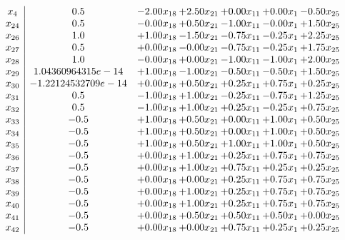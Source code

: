 \documentclass[8pt]{article}
\begin{document}
\[\begin{array}{c| c c@{\hskip 2pt} c@{\hskip 2pt} c@{\hskip 2pt} c@{\hskip 2pt} c@{\hskip 2pt} }
 x_{4}   &  0.5 & -2.00 x_{18} & +  2.50 x_{21} & +  0.00 x_{11} & +  0.00 x_{1} & -0.50 x_{25}\\
 x_{24}   &  0.5 & -0.00 x_{18} & +  0.50 x_{21} & -1.00 x_{11} & -0.00 x_{1} & +  1.50 x_{25}\\
 x_{26}   &  1.0 & +  1.00 x_{18} & -1.50 x_{21} & -0.75 x_{11} & -0.25 x_{1} & +  2.25 x_{25}\\
 x_{27}   &  0.5 & +  0.00 x_{18} & -0.00 x_{21} & -0.75 x_{11} & -0.25 x_{1} & +  1.75 x_{25}\\
 x_{28}   &  1.0 & -0.00 x_{18} & +  0.00 x_{21} & -1.00 x_{11} & -1.00 x_{1} & +  2.00 x_{25}\\
 x_{29}   &  1.04360964315e-14 & +  1.00 x_{18} & -1.00 x_{21} & -0.50 x_{11} & -0.50 x_{1} & +  1.50 x_{25}\\
 x_{30}   &  -1.22124532709e-14 & +  0.00 x_{18} & +  0.50 x_{21} & +  0.25 x_{11} & +  0.75 x_{1} & +  0.25 x_{25}\\
 x_{31}   &  0.5 & -1.00 x_{18} & +  1.00 x_{21} & -0.25 x_{11} & -0.75 x_{1} & +  1.25 x_{25}\\
 x_{32}   &  0.5 & -1.00 x_{18} & +  1.00 x_{21} & +  0.25 x_{11} & -0.25 x_{1} & +  0.75 x_{25}\\
 x_{33}   &  -0.5 & +  1.00 x_{18} & +  0.50 x_{21} & +  0.00 x_{11} & +  1.00 x_{1} & +  0.50 x_{25}\\
 x_{34}   &  -0.5 & +  1.00 x_{18} & +  0.50 x_{21} & +  0.00 x_{11} & +  1.00 x_{1} & +  0.50 x_{25}\\
 x_{35}   &  -0.5 & +  1.00 x_{18} & +  0.50 x_{21} & +  1.00 x_{11} & +  1.00 x_{1} & +  0.50 x_{25}\\
 x_{36}   &  -0.5 & +  0.00 x_{18} & +  1.00 x_{21} & +  0.25 x_{11} & +  0.75 x_{1} & +  0.75 x_{25}\\
 x_{37}   &  -0.5 & +  0.00 x_{18} & +  1.00 x_{21} & +  0.75 x_{11} & +  0.25 x_{1} & +  0.25 x_{25}\\
 x_{38}   &  -0.5 & +  0.00 x_{18} & +  0.00 x_{21} & +  0.25 x_{11} & +  0.75 x_{1} & +  0.75 x_{25}\\
 x_{39}   &  -0.5 & +  0.00 x_{18} & +  1.00 x_{21} & +  0.25 x_{11} & +  0.75 x_{1} & +  0.75 x_{25}\\
 x_{40}   &  -0.5 & +  0.00 x_{18} & +  1.00 x_{21} & +  0.25 x_{11} & +  0.75 x_{1} & +  0.75 x_{25}\\
 x_{41}   &  -0.5 & +  0.00 x_{18} & +  0.50 x_{21} & +  0.50 x_{11} & +  0.50 x_{1} & +  0.00 x_{25}\\
 x_{42}   &  -0.5 & +  0.00 x_{18} & +  0.00 x_{21} & +  0.75 x_{11} & +  0.25 x_{1} & +  0.25 x_{25}\\

\end{array}\]
\end{document}
